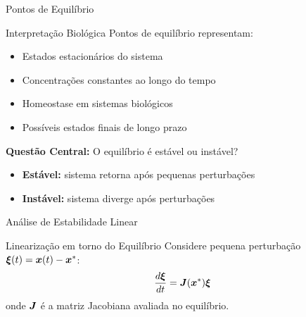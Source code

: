 \begin{frame}[allowframebreaks]{Pontos de Equilíbrio}

\vspace{0.3cm}

\begin{exampleblock}{Interpretação Biológica}
Pontos de equilíbrio representam:
\begin{itemize}
    \item Estados estacionários do sistema
    \item Concentrações constantes ao longo do tempo
    \item Homeostase em sistemas biológicos
    \item Possíveis estados finais de longo prazo
\end{itemize}
\end{exampleblock}

\vspace{0.3cm}

\textbf{Questão Central:} O equilíbrio é estável ou instável?
\begin{itemize}
    \item \textbf{Estável:} sistema retorna após pequenas perturbações
    \item \textbf{Instável:} sistema diverge após perturbações
\end{itemize}
\end{frame}

\begin{frame}[allowframebreaks]{Análise de Estabilidade Linear}
\begin{block}{Linearização em torno do Equilíbrio}
Considere pequena perturbação $\boldsymbol{\xi}(t) = \boldsymbol{x}(t) - \boldsymbol{x}^*$:
\begin{equation*}
\frac{d\boldsymbol{\xi}}{dt} = \boldsymbol{J}(\boldsymbol{x}^*) \boldsymbol{\xi}
\end{equation*}
onde $\boldsymbol{J}$ é a matriz Jacobiana avaliada no equilíbrio.
\end{block}

\vspace{0.3cm}

\end{frame}

